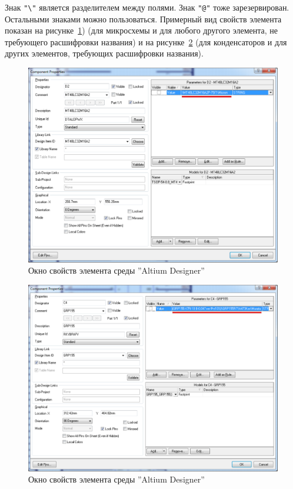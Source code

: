 Знак \verb|"\"| является разделителем между полями. Знак \verb|"@"| тоже
зарезервирован. Остальными знаками можно пользоваться. Примерный вид свойств элемента показан на рисунке~\ref{p:pic_ad_component_properties_d}) (для микросхемы и для любого другого элемента, не требующего расшифровки названия) и на рисунке~\ref{p:pic_ad_component_properties_c} (для конденсаторов и для других элементов, требующих расшифровки названия).

\begin{figure}[H]\center
  \includegraphics[width=1\textwidth]{VP_auto/pictures/ad/pic_ad_component_properties_d}
  \caption{Окно свойств элемента среды ''Altium Designer''} \label{p:pic_ad_component_properties_d}
\end{figure}

\newpage
\begin{figure}[H]\center
  \includegraphics[width=1\textwidth]{VP_auto/pictures/ad/pic_ad_component_properties_c}
  \caption{Окно свойств элемента среды ''Altium Designer''} \label{p:pic_ad_component_properties_c}
\end{figure}

